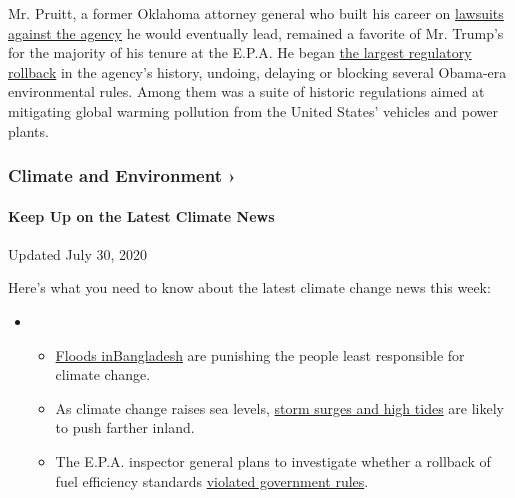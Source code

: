 Mr. Pruitt, a former Oklahoma attorney general who built his career on
\href{https://www.nytimes.com/interactive/2017/01/14/us/politics/document-Pruitt-v-EPA-a-Compilation-of-Oklahoma-14.html}{lawsuits
against the agency} he would eventually lead, remained a favorite of Mr.
Trump's for the majority of his tenure at the E.P.A. He began
\href{https://www.nytimes.com/2017/07/01/us/politics/trump-epa-chief-pruitt-regulations-climate-change.html}{the
largest regulatory rollback} in the agency's history, undoing, delaying
or blocking several Obama-era environmental rules. Among them was a
suite of historic regulations aimed at mitigating global warming
pollution from the United States' vehicles and power plants.

\href{https://www.nytimes.com/section/climate?action=click\&pgtype=Article\&state=default\&region=MAIN_CONTENT_1\&context=storylines_keepup}{}

\hypertarget{climate-and-environment-}{%
\subsubsection{Climate and Environment
›}\label{climate-and-environment-}}

\hypertarget{keep-up-on-the-latest-climate-news}{%
\paragraph{Keep Up on the Latest Climate
News}\label{keep-up-on-the-latest-climate-news}}

Updated July 30, 2020

Here's what you need to know about the latest climate change news this
week:

\begin{itemize}
\item
  \begin{itemize}
  \tightlist
  \item
    \href{https://www.nytimes.com/2020/07/30/climate/bangladesh-floods.html?action=click\&pgtype=Article\&state=default\&region=MAIN_CONTENT_1\&context=storylines_keepup}{Floods
    in}\href{https://www.nytimes.com/2020/07/30/climate/bangladesh-floods.html?action=click\&pgtype=Article\&state=default\&region=MAIN_CONTENT_1\&context=storylines_keepup}{Bangladesh}
    are punishing the people least responsible for climate change.
  \item
    As climate change raises sea levels,
    \href{https://www.nytimes.com/2020/07/30/climate/sea-level-inland-floods.html?action=click\&pgtype=Article\&state=default\&region=MAIN_CONTENT_1\&context=storylines_keepup}{storm
    surges and high tides} are likely to push farther inland.
  \item
    The E.P.A. inspector general plans to investigate whether a rollback
    of fuel efficiency standards
    \href{https://www.nytimes.com/2020/07/27/climate/trump-fuel-efficiency-rule.html?action=click\&pgtype=Article\&state=default\&region=MAIN_CONTENT_1\&context=storylines_keepup}{violated
    government rules}.
  \end{itemize}
\end{itemize}

